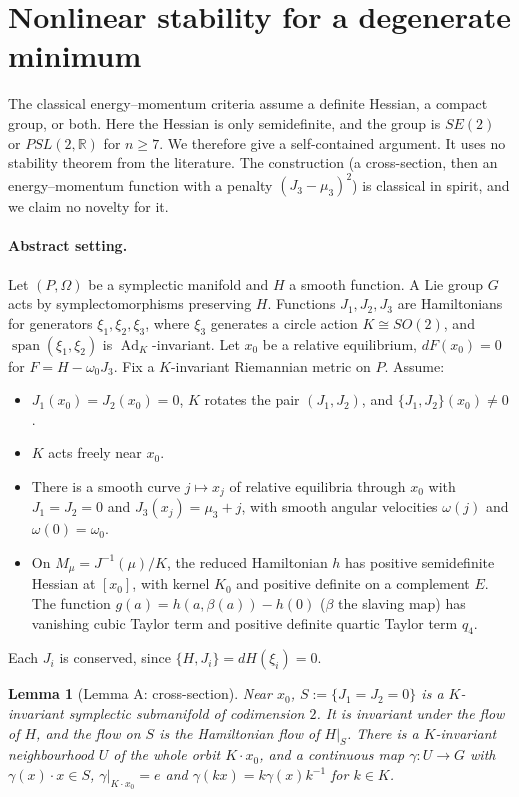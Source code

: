 \documentclass[11pt]{article}
\newtheorem{lemma}[theorem]{Lemma}
\theoremstyle{definition}
\theoremstyle{remark}
\newcommand{\R}{\mathbb{R}}
\begin{document}
\section{Nonlinear stability for a degenerate minimum}\label{sec:nonlinear}

The classical energy--momentum criteria assume a definite Hessian, a compact group, or both. Here the
Hessian is only semidefinite, and the group is $SE(2)$ or $PSL(2,\R)$ for $n\ge7$. We therefore give a
self-contained argument. It uses no stability theorem from the literature. The construction (a cross-section,
then an energy--momentum function with a penalty $(J_3-\mu_3)^2$) is classical in spirit, and we claim no
novelty for it.

\paragraph{Abstract setting.} Let $(P,\Omega)$ be a symplectic manifold and $H$ a smooth function. A Lie
group $G$ acts by symplectomorphisms preserving $H$. Functions $J_1,J_2,J_3$ are Hamiltonians for
generators $\xi_1,\xi_2,\xi_3$, where $\xi_3$ generates a circle action $K\cong SO(2)$, and
$\operatorname{span}(\xi_1,\xi_2)$ is $\operatorname{Ad}_K$-invariant. Let $x_0$ be a relative equilibrium,
$dF(x_0)=0$ for $F=H-\omega_0J_3$. Fix a $K$-invariant Riemannian metric on $P$. Assume:
\begin{itemize}
\item[(A1)] $J_1(x_0)=J_2(x_0)=0$, $K$ rotates the pair $(J_1,J_2)$, and $\{J_1,J_2\}(x_0)\ne0$.
\item[(A2)] $K$ acts freely near $x_0$.
\item[(A3)] There is a smooth curve $j\mapsto x_j$ of relative equilibria through $x_0$ with
$J_1=J_2=0$ and $J_3(x_j)=\mu_3+j$, with smooth angular velocities $\omega(j)$ and $\omega(0)=\omega_0$.
\item[(A4)] On $M_\mu=J^{-1}(\mu)/K$, the reduced Hamiltonian $h$ has positive semidefinite Hessian at
$[x_0]$, with kernel $K_0$ and positive definite on a complement $E$. The function $g(a)=h(a,\beta(a))-h(0)$
($\beta$ the slaving map) has vanishing cubic Taylor term and positive definite quartic Taylor term $q_4$.
\end{itemize}
Each $J_i$ is conserved, since $\{H,J_i\}=dH(\xi_i)=0$.

\begin{lemma}[Lemma A: cross-section]\label{lem:A}
Near $x_0$, $S:=\{J_1=J_2=0\}$ is a $K$-invariant symplectic submanifold of codimension $2$. It is invariant
under the flow of $H$, and the flow on $S$ is the Hamiltonian flow of $H|_S$. There is a $K$-invariant
neighbourhood $U$ of the whole orbit $K\cdot x_0$, and a continuous map $\gamma:U\to G$ with
$\gamma(x)\cdot x\in S$, $\gamma|_{K\cdot x_0}=e$ and $\gamma(kx)=k\gamma(x)k^{-1}$ for $k\in K$.
\end{lemma}
\end{document}
